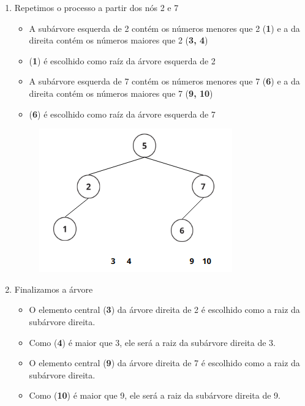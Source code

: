 \documentclass[a4paper,12pt]{article}
\begin{document}
\begin{enumerate}
    \item Repetimos o processo a partir dos nós 2 e 7
    \begin{itemize}
        \item A subárvore esquerda de 2 contém os números menores que 2 (\textbf{1}) e a da direita contém os números maiores que 2 (\textbf{3, 4})
        \item (\textbf{1}) é escolhido como raíz da árvore esquerda de 2
        \item A subárvore esquerda de 7 contém os números menores que 7 (\textbf{6}) e a da direita contém os números maiores que 7 (\textbf{9, 10})
        \item (\textbf{6}) é escolhido como raíz da árvore esquerda de 7
    \end{itemize}
    
    \begin{figure}[!ht]
	\centering
	\includegraphics[scale=0.7]{figures/binaria/passo3.png}
	\label{fig:bubble_sort_example}
    \end{figure}
    
    \item Finalizamos a árvore
    \begin{itemize}
        \item O elemento central (\textbf{3}) da árvore direita de 2 é escolhido como a raiz da subárvore direita.
        \item Como (\textbf{4}) é maior que 3, ele será a  raiz da subárvore direita de 3.
        \item O elemento central (\textbf{9}) da árvore direita de 7 é escolhido como a raiz da subárvore direita.
        \item Como (\textbf{10}) é maior que 9, ele será a raiz da subárvore direita de 9.
    \end{itemize}


\end{enumerate}
\end{document}

